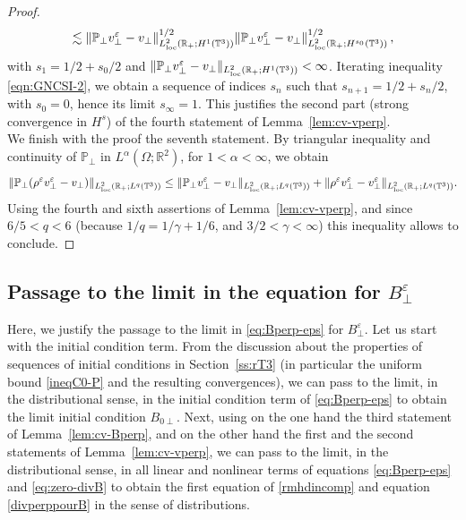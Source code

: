 \documentclass[11pt,reqno]{amsart}
\def \R{{\mathbb{R}}}
\def \T{{\mathbb{T}}}
\def \P{{\mathbb{P}}}
\begin{document}
\begin{proof}
\begin{equation}
      \lesssim  \|  \P_\perp v_\perp^\varepsilon -v_\perp\|_{L_{\rm loc}^2(\R_+;  H^1(\T^3))}^{1/2}
      \|  \P_\perp v_\perp^\varepsilon -v_\perp\|_{L_{\rm loc}^2(\R_+;  H^{s_0}(\T^3))}^{1/2}\,,
    \end{equation}
    with $s_1=1/2+ s_0/2$ and $\|  \P_\perp v_\perp^\varepsilon -v_\perp\|_{L_{\rm loc}^2(\R_+; H^1(\T^3))} <\infty$. Iterating inequality \eqref{eqn:GNCSI-2}, we obtain a sequence of indices $s_n$ such that $s_{n+1}=1/2+ s_n/2$, with $s_0=0$, hence its limit $s_\infty=1$. This justifies the second part (strong convergence in $H^s$) of the fourth statement of Lemma~\ref{lem:cv-vperp}.\\
    We finish with the proof the seventh statement. By triangular inequality and continuity of $\P_\perp$ in $L^\alpha(\Omega; \R^2)$, for $1<\alpha < \infty$, we obtain
    \[
    \|  \P_\perp (\rho^\varepsilon v_\perp^\varepsilon -v_\perp)\|_{L_{\rm loc}^2(\R_+; L^q(\T^3))} \leq
    \|  \P_\perp v_\perp^\varepsilon -v_\perp \|_{L_{\rm loc}^2(\R_+;L^q(\T^3))}+ \| \rho^\varepsilon v_\perp^\varepsilon -v_\perp^\varepsilon\|_{L_{\rm loc}^2(\R_+; L^q(\T^3))} .
    \]
    Using the fourth and  sixth assertions of Lemma~\ref{lem:cv-vperp}, and since $6/5<q<6$ (because $1/q=1/\gamma+1/6$, and $3/2<\gamma<\infty$) this inequality allows to conclude.
\end{proof}


\subsection{Passage to the limit in the equation for $B_\perp^\varepsilon $}
\label{ss:cv-Bperp-P}
Here, we justify the passage to the limit in \eqref{eq:Bperp-eps} for $B_\perp^\varepsilon$. Let us start with the initial condition term.
From the discussion about the properties of sequences of initial conditions in Section~\ref{ss:rT3} (in particular the uniform bound \eqref{ineqC0-P} and the resulting convergences),
we can pass to the limit, in the distributional sense, in the initial condition term of \eqref{eq:Bperp-eps} to obtain the limit initial condition $B_{0 \perp}$.
Next, using on the one hand the third statement of Lemma~\ref{lem:cv-Bperp}, and on the other hand the first and the second statements of Lemma~\ref{lem:cv-vperp}, we can pass to the limit, in the distributional sense, in all linear and nonlinear terms of equations  \eqref{eq:Bperp-eps} and \eqref{eq:zero-divB} to obtain the first equation of \eqref{rmhdincomp}
and equation \eqref{divperppourB} in the sense of distributions.
\end{document}
